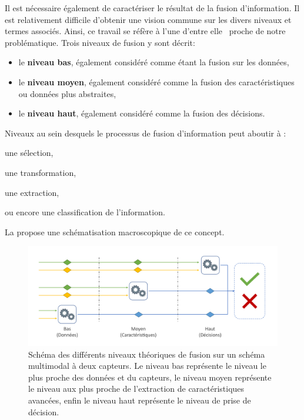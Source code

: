 Il est nécessaire également de caractériser le résultat de la fusion d'information. Il est relativement difficile d'obtenir une vision commune sur les divers niveaux et termes associés. Ainsi, ce travail se réfère à l'une d'entre elle~\cite{Dasarathy1997} proche de notre problématique. Trois niveaux de fusion y sont décrit:
\begin{itemize}
\item le \textbf{niveau bas}, également considéré comme étant la fusion sur les données,
\item le\textbf{ niveau moyen}, également considéré comme la fusion des caractéristiques ou données plus abstraites,
\item le \textbf{niveau haut}, également considéré comme la fusion des décisions.
\end{itemize} Niveaux au sein desquels le processus de fusion d'information peut aboutir à :
\begin{inlinerate}
\item une sélection,
\item une transformation,
\item une extraction,
\item ou encore une classification de l'information.
\end{inlinerate} La  propose une schématisation macroscopique de ce concept.\par
 
\begin{figure}[H]
    \centering
    \includegraphics[width=\linewidth]{contents/chapter_3/resources/scheme_overview_fusion.pdf}
    \caption{Schéma des différents niveaux théoriques de fusion sur un schéma multimodal à deux capteurs. Le niveau bas représente le niveau le plus proche des données et du capteurs, le niveau moyen représente le niveau aux plus proche de l'extraction de caractéristiques avancées, enfin le niveau haut représente le niveau de prise de décision.}
    \label{fig:scheme_overview_fusion}
\end{figure}\par

